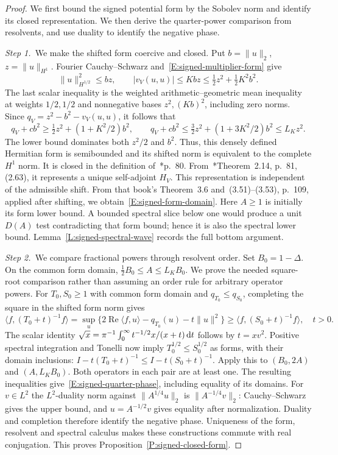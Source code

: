\begin{proof}
  We first bound the signed potential form by the Sobolev norm and identify
  its closed representation. We then derive the quarter-power comparison from
  resolvents, and use duality to identify the negative phase.


  \medskip
  \noindent\textit{Step 1.~}We make the shifted form coercive and closed.
  Put $b = \|u\|_2$, $z = \|u\|_{H^1}$. Fourier Cauchy--Schwarz
  and~\eqref{E:signed-multiplier-form} give
  \[
    \|u\|_{H^{1/2}}^2\le bz,\qquad
    |v_V(u,u)|\le Kbz\le\tfrac12z^2+\tfrac12K^2b^2 .
  \]
  The last scalar inequality is the weighted arithmetic--geometric mean
  inequality at weights $1/2,1/2$ and nonnegative bases $z^2,(Kb)^2$, including
  zero norms. Since $q_V = z^2-b^2-v_V(u,u)$, it follows that
  \[
    q_V+cb^2\ge\tfrac12z^2+(1+K^2/2)b^2,\qquad
    q_V+cb^2\le\tfrac32z^2+(1+3K^2/2)b^2\le L_Kz^2.
  \]
  The lower bound dominates both $z^2/2$ and $b^2$. Thus, this densely defined
  Hermitian form is semibounded and its shifted norm is equivalent to the
  complete $H^1$ norm. It is closed in the definition
  of~\cite{teschl:14:mathematical}*{p.~80}.
  From~\cite{teschl:14:mathematical}*{Theorem~2.14, p.~81, (2.63)}, it
  represents a unique self-adjoint $H_V$. This representation is independent of
  the admissible shift. From that book's Theorem~3.6 and~(3.51)--(3.53), p.~109,
  applied after shifting, we obtain~\eqref{E:signed-form-domain}. Here $A \ge 1$
  is initially its form lower bound. A bounded spectral slice below one would
  produce a unit $D(A)$ test contradicting that form bound; hence it is also the
  spectral lower bound. Lemma~\ref{L:signed-spectral-wave} records the full
  bottom argument.


  \medskip
  \noindent\textit{Step 2.~}We compare fractional powers through resolvent
  order.
  Set $B_0 = 1-\Delta$. On the common form domain, $\tfrac12B_0 \le A \le
  L_KB_0$. We prove the needed square-root comparison rather than assuming an
  order rule for arbitrary operator powers. For $T_0,S_0 \ge 1$ with common form
  domain and $q_{T_0} \le q_{S_0}$, completing the square in the shifted form
  norm gives
  \[
    \langle f,(T_0+t)^{-1}f\rangle
    =\sup_u\{2\operatorname{Re}\langle f,u\rangle
    -q_{T_0}(u)-t\|u\|^2\}
    \ge\langle f,(S_0+t)^{-1}f\rangle,\quad t>0 .
  \]
  The scalar identity $\sqrt x = \pi^{-1}\int_0^\infty t^{-1/2}x/(x+t)\,\mathrm{d} t$
  follows by $t = xv^2$. Positive spectral integration and Tonelli now imply
  $T_0^{1/2} \le S_0^{1/2}$ as forms, with their domain inclusions:
  $I-t(T_0+t)^{-1} \le I-t(S_0+t)^{-1}$. Apply this to $(B_0,2A)$ and
  $(A,L_KB_0)$. Both operators in each pair are at least one. The resulting
  inequalities give~\eqref{E:signed-quarter-phase}, including equality of its
  domains. For $v \in L^2$ the $L^2$-duality norm against $\|A^{1/4}u\|_2$ is
  $\|A^{-1/4}v\|_2$: Cauchy--Schwarz gives the upper bound, and $u = A^{-1/2}v$
  gives equality after normalization. Duality and completion therefore identify
  the negative phase. Uniqueness of the form, resolvent and spectral calculus
  makes these constructions commute with real conjugation. This proves
  Proposition~\ref{P:signed-closed-form}.
\end{proof}

